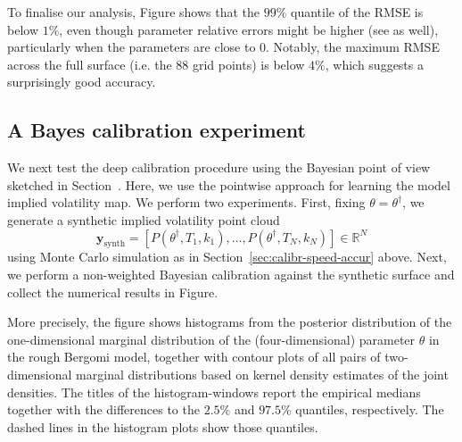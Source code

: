 \documentclass{article}
\theoremstyle{remark}
\begin{document}
To finalise our analysis, Figure shows that the $99\%$ quantile of the RMSE is below $1\%$,
even though parameter relative errors might be higher (see 
as well), particularly when the parameters are close to $0$. Notably, the
maximum RMSE across the full surface (i.e. the 88 grid points) is below $4\%$, which suggests a surprisingly good
accuracy.

\subsection{A Bayes calibration experiment}
\label{sec:bayes-calibr-exper}


We next test the deep calibration procedure using the Bayesian point of view
sketched in Section~. Here, we use the pointwise
approach for learning the model implied volatility map.  We perform two
experiments. First, fixing $\theta = \theta^\dagger$, we generate a synthetic
implied volatility point cloud
\begin{equation*}
  \bm{y}_{\textrm{synth}}= \left[P\left(\theta^\dagger, T_1, k_1\right),
    \ldots, P\left(\theta^\dagger, T_N, k_N\right)\right] \in \mathbb{R}^N
\end{equation*}
using Monte Carlo simulation as in Section~\ref{sec:calibr-speed-accur}
above. Next, we perform a non-weighted Bayesian calibration against the
synthetic surface and collect the numerical results in Figure. 

More precisely, the figure shows histograms from the posterior distribution of
the one-dimensional marginal distribution of the (four-dimensional) parameter
$\theta$ in the rough Bergomi model, together with contour plots of all pairs
of two-dimensional marginal distributions based on kernel density estimates of
the joint densities. The titles of the histogram-windows report the empirical
medians together with the differences to the $2.5\%$ and $97.5\%$ quantiles,
respectively. The dashed lines in the histogram plots show those quantiles.
\end{document}
